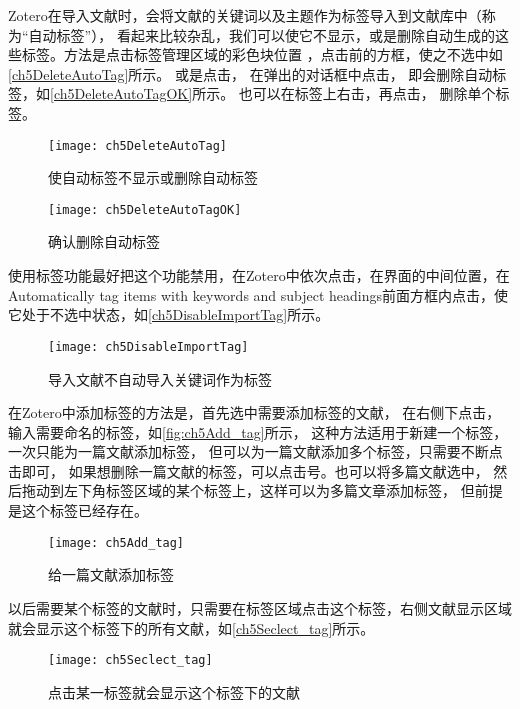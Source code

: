 \documentclass[cn,11pt,chinese]{elegantbook}
\begin{document}
			Zotero在导入文献时，会将文献的关键词以及主题作为标签导入到文献库中（称为“自动标签”），
			看起来比较杂乱，我们可以使它不显示，或是删除自动生成的这些标签。方法是点击标签管理区域的彩色块位置
			，点击前的方框，使之不选中如\autoref{ch5DeleteAutoTag}所示。
			或是点击，
			在弹出的对话框中点击，
			即会删除自动标签，如\autoref{ch5DeleteAutoTagOK}所示。
			也可以在标签上右击，再点击，
			删除单个标签。
			
				\begin{figure}[htbp]
					\centering
					\texttt{[image: ch5DeleteAutoTag]}
					\caption{使自动标签不显示或删除自动标签}
					\label{ch5DeleteAutoTag}
				\end{figure}
				\begin{figure}[htbp]
					\centering
					\texttt{[image: ch5DeleteAutoTagOK]}
					\caption{确认删除自动标签}
					\label{ch5DeleteAutoTagOK}
				\end{figure}
			
			使用标签功能最好把这个功能禁用，在Zotero中依次点击，在界面的中间位置，在
			Automatically tag items with keywords and subject headings前面方框内点击，使它处于不选中状态，如\autoref{ch5DisableImportTag}所示。
				\begin{figure}[htbp]
					\centering
					\texttt{[image: ch5DisableImportTag]}
					\caption{导入文献不自动导入关键词作为标签}
					\label{ch5DisableImportTag}
				\end{figure}
						
			在Zotero中添加标签的方法是，首先选中需要添加标签的文献，
			在右侧下点击，
			输入需要命名的标签，如\autoref{fig:ch5Add_tag}所示，
			这种方法适用于新建一个标签，一次只能为一篇文献添加标签，
			但可以为一篇文献添加多个标签，只需要不断点击即可，
			如果想删除一篇文献的标签，可以点击\menu[,]{-}号。也可以将多篇文献选中，
			然后拖动到左下角标签区域的某个标签上，这样可以为多篇文章添加标签，
			但前提是这个标签已经存在。
				\begin{figure}[htbp]
					\centering
					\texttt{[image: ch5Add\_tag]}
					\caption{给一篇文献添加标签}
					\label{fig:ch5Add_tag}
				\end{figure}
			
			以后需要某个标签的文献时，只需要在标签区域点击这个标签，右侧文献显示区域就会显示这个标签下的所有文献，如\autoref{ch5Seclect_tag}所示。
				\begin{figure}[htbp]
					\centering
					\texttt{[image: ch5Seclect\_tag]}
					\caption{点击某一标签就会显示这个标签下的文献}
					\label{ch5Seclect_tag}
				\end{figure}
			
\end{document}
